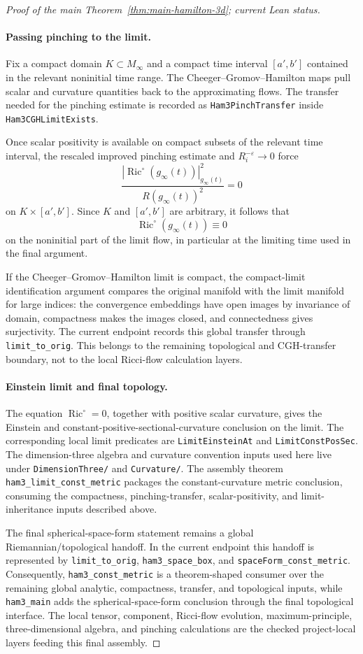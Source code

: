 \documentclass[11pt]{article}
\theoremstyle{plain}
\theoremstyle{definition}
\theoremstyle{remark}
\newcommand{\Ric}{\operatorname{Ric}}
\newcommand{\norm}[1]{\left|#1\right|}
\newcommand{\eps}{\varepsilon}
\newcommand{\leanref}[1]{\nolinkurl{#1}}
\newcommand{\leanfile}[1]{\nolinkurl{#1}}
\newcommand{\rfdir}[1]{\leanfile{#1/}}
\begin{document}
\begin{proof}[Proof of the main Theorem~\ref{thm:main-hamilton-3d}; current Lean status]
\paragraph{Passing pinching to the limit.}
Fix a compact domain \(K\subset M_\infty\) and a compact time interval
\([a',b']\) contained in the relevant noninitial time range.  The
Cheeger--Gromov--Hamilton maps pull scalar and curvature quantities back to the
approximating flows.  The transfer needed for the pinching estimate is recorded
as \leanref{Ham3PinchTransfer} inside \leanref{Ham3CGHLimitExists}.

Once scalar positivity is available on compact subsets of the relevant time
interval, the rescaled improved pinching estimate and \(R_i^{-\eps}\to0\) force
\[
  \frac{\norm{\Ric^\circ(g_\infty(t))}_{g_\infty(t)}^2}
       {R(g_\infty(t))^2}=0
\]
on \(K\times[a',b']\).  Since \(K\) and \([a',b']\) are arbitrary, it follows
that
\[
\Ric^\circ(g_\infty(t))\equiv0
\]
on the noninitial part of the limit flow, in particular at the limiting time
used in the final argument.

If the Cheeger--Gromov--Hamilton limit is compact, the compact-limit
identification argument compares the original manifold with the limit manifold
for large indices: the convergence embeddings have open images by invariance of
domain, compactness makes the images closed, and connectedness gives
surjectivity.  The current endpoint records this global transfer through
\leanref{limit_to_orig}.  This belongs to the remaining topological and
CGH-transfer boundary, not to the local Ricci-flow calculation layers.

\paragraph{Einstein limit and final topology.}
The equation \(\Ric^\circ=0\), together with positive scalar curvature, gives
the Einstein and constant-positive-sectional-curvature conclusion on the limit.
The corresponding local limit predicates are \leanref{LimitEinsteinAt} and
\leanref{LimitConstPosSec}.  The dimension-three algebra and curvature
convention inputs used here live under \rfdir{DimensionThree} and
\rfdir{Curvature}.  The assembly theorem \leanref{ham3_limit_const_metric}
packages the constant-curvature metric conclusion, consuming the compactness,
pinching-transfer, scalar-positivity, and limit-inheritance inputs described
above.

The final spherical-space-form statement remains a global Riemannian/topological
handoff.  In the current endpoint this handoff is represented by
\leanref{limit_to_orig}, \leanref{ham3_space_box}, and
\leanref{spaceForm_const_metric}.  Consequently, \leanref{ham3_const_metric} is
a theorem-shaped consumer over the remaining global analytic, compactness, transfer, and topological inputs, while
\leanref{ham3_main} adds the spherical-space-form conclusion through the final
topological interface.  The local tensor, component, Ricci-flow evolution,
maximum-principle, three-dimensional algebra, and pinching calculations are the
checked project-local layers feeding this final assembly.
\end{proof}
\end{document}
